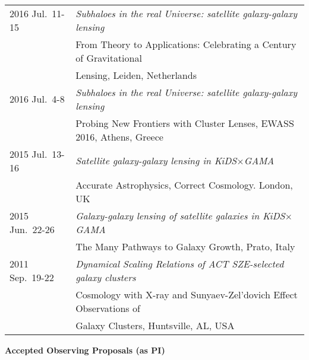 \documentclass[11pt]{article}
\begin{document}
\vspace{0.1cm}
\hspace{-0.4cm}{\bf Contributed Talks}\\
\vspace{-0.2cm}
\begin{table}[h!]
\begin{tabular}{l l}

2016 Jul.~11-15 & {\it Subhaloes in the real Universe: satellite galaxy-galaxy lensing}\\
                & From Theory to Applications: Celebrating a Century of Gravitational\\
                & Lensing, Leiden, Netherlands\\
2016 Jul.~4-8   & {\it Subhaloes in the real Universe: satellite galaxy-galaxy lensing}\\
                & Probing New Frontiers with Cluster Lenses, EWASS 2016, Athens, Greece\\
2015 Jul.~13-16 & {\it Satellite galaxy-galaxy lensing in KiDS$\times$GAMA}\\
                & Accurate Astrophysics, Correct Cosmology. London, UK\\
2015 Jun.~22-26 & {\it Galaxy-galaxy lensing of satellite galaxies in KiDS$\times$GAMA}\\
                & The Many Pathways to Galaxy Growth, Prato, Italy\\
2011 Sep.~19-22 & {\it Dynamical Scaling Relations of ACT SZE-selected galaxy clusters}\\
                & Cosmology with X-ray and Sunyaev-Zel'dovich Effect Observations of\\
                & Galaxy Clusters, Huntsville, AL, USA

\end{tabular}
\end{table}


\noindent
{\bf\Large Accepted Observing Proposals (as PI)}\\
\vspace{-0.2cm}
\end{document}
